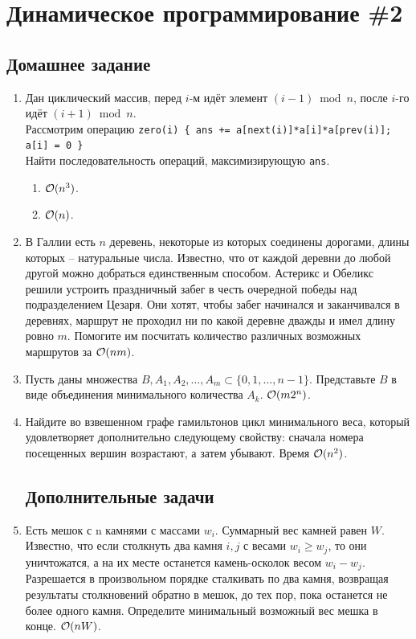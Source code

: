 \section{Динамическое программирование \#2}

\subsection{Домашнее задание}
\begin{enumerate}
  \item
    Дан циклический массив, перед $i$-м идёт элемент $(i{-}1) \bmod n$,
    после $i$-го идёт $(i{+}1) \bmod n$. \\
    Рассмотрим операцию \texttt{zero(i) \{ ans += a[next(i)]*a[i]*a[prev(i)]; a[i] = 0 \}}\\
    Найти последовательность операций, максимизирующую \texttt{ans}.
    \begin{enumerate}
      \item $\mathcal{O}(n^3)$.
      \item $\mathcal{O}(n)$.
    \end{enumerate}

  \item
    В Галлии есть $n$ деревень, некоторые из которых соединены дорогами, длины которых --
    натуральные числа. Известно, что от каждой деревни до любой другой можно добраться
    единственным способом. Астерикс и Обеликс решили устроить праздничный забег в честь
    очередной победы над подразделением Цезаря. Они хотят, чтобы забег начинался и заканчивался
    в деревнях, маршрут не проходил ни по какой деревне дважды и имел длину ровно $m$.
    Помогите им посчитать количество различных возможных маршрутов за $\mathcal{O}(nm)$.

  \item
    Пусть даны множества $B, A_1, A_2, \dots , A_m \subset \{0, 1, \dots , n - 1\}$.
    Представьте $B$ в виде объединения минимального количества $A_k$. $\mathcal{O}(m 2^n)$.

  \item
    Найдите во взвешенном графе гамильтонов цикл
    минимального веса, который удовлетворяет дополнительно следующему свойству: сначала
    номера посещенных вершин возрастают, а затем убывают. Время $\mathcal{O}(n^2)$.

\subsection*{Дополнительные задачи}
 \item
    Есть мешок с n камнями с массами $w_i$. Суммарный вес камней равен $W$. Известно, что если столкнуть два камня $i, j$ с весами $w_i \geq w_j$, то они уничтожатся, а на их месте останется камень-осколок весом $w_i - w_j$. Разрешается в произвольном порядке сталкивать по два камня, возвращая результаты столкновений обратно в мешок, до тех пор, пока останется не более одного камня. Определите минимальный возможный вес мешка в конце. $\mathcal{O}(nW)$.


\end{enumerate}
